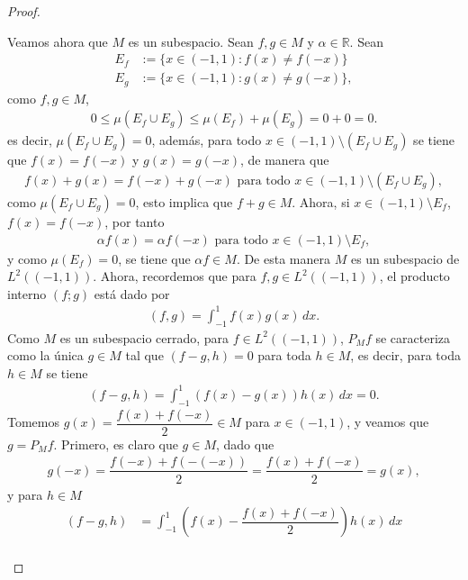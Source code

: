 \begin{proof}
\begin{enumerate}
\begin{enumerate}
        Veamos ahora que $M$ es un subespacio. Sean $f,g \in M$ y $\alpha\in \mathbb{R}$. Sean 
        \begin{align*}
            E_f&:=\{x \in (-1,1):f(x)\neq f(-x)\}\\
            E_g&:=\{x \in (-1,1):g(x)\neq g(-x)\},
        \end{align*}
        como $f,g \in M$, 
        \begin{align*}
            0\leq \mu(E_f\cup E_g)\leq \mu(E_f)+\mu(E_g)=0+0=0.
        \end{align*}
        es decir, $\mu(E_f\cup E_g)=0$, además, para todo $x \in (-1,1)\setminus (E_f\cup E_g)$ se tiene que $f(x)=f(-x)$ y $g(x)=g(-x)$, de manera que 
        \begin{align*}
            f(x)+g(x)=f(-x)+g(-x) \text{ para todo } x \in (-1,1)\setminus (E_f\cup E_g),
        \end{align*}
        como $\mu(E_f\cup E_g)=0$, esto implica que $f+g\in M$. Ahora, si $x \in (-1,1)\setminus E_f$, $f(x)=f(-x)$, por tanto 
        \begin{align*}
            \alpha f(x)=\alpha f(-x) \text{ para todo } x \in (-1,1)\setminus E_f,
        \end{align*}
        y como $\mu(E_f)=0$, se tiene que $\alpha f\in M$. De esta manera $M$ es un subespacio de $L^2((-1,1))$.
        Ahora, recordemos que para $f,g \in L^2((-1,1))$, el producto interno $(f;g)$ está dado por 
        \begin{align*}
            (f,g)=\int_{-1}^1 f(x)g(x)\, dx.
        \end{align*}
        Como $M$ es un subespacio cerrado, para $f \in L^2((-1,1))$, $P_M f$ se caracteriza como la única $g\in M$ tal que $(f-g,h)=0$ para toda $h \in M$, es decir, para toda $h \in M$ se tiene
        \begin{align*}
            (f-g,h)=\int_{-1}^1 (f(x)-g(x))h(x)\, dx=0.
        \end{align*}
        Tomemos $g(x)=\dfrac{f(x)+f(-x)}{2}\in M$ para $x \in (-1,1)$, y veamos que\\ $g=P_M f$. Primero, es claro que $g \in M$, dado que 
        \begin{align*}
            g(-x)=\dfrac{f(-x)+f(-(-x))}{2}=\dfrac{f(x)+f(-x)}{2}=g(x),
        \end{align*}
        y para $h \in M$
        \begin{align*}
            (f-g,h)&=\int_{-1}^1\left(f(x)-\dfrac{f(x)+f(-x)}{2}\right)h(x)\, dx\\

\end{align*}
\end{enumerate}
\end{enumerate}
\end{proof}
